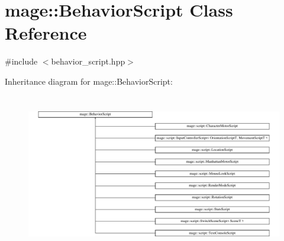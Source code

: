 \hypertarget{classmage_1_1_behavior_script}{}\section{mage\+:\+:Behavior\+Script Class Reference}
\label{classmage_1_1_behavior_script}


{\ttfamily \#include $<$behavior\+\_\+script.\+hpp$>$}

Inheritance diagram for mage\+:\+:Behavior\+Script\+:\begin{figure}[H]
\begin{center}
\leavevmode
\includegraphics[height=6.968326cm]{classmage_1_1_behavior_script}
\end{center}
\end{figure}
